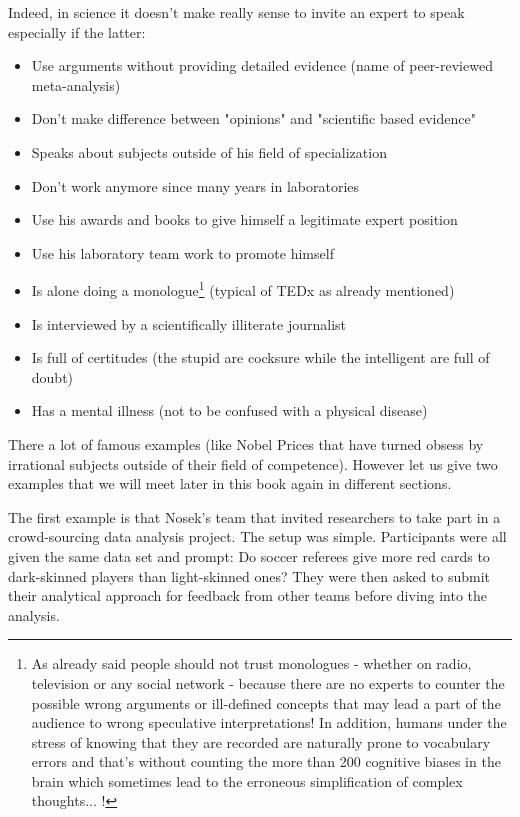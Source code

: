 	Indeed, in science it doesn't make really sense to invite an expert to speak especially if the latter:
	\begin{itemize}
		\item Use arguments without providing detailed evidence (name of peer-reviewed meta-analysis)
		
		\item Don't make difference between "opinions" and "scientific based evidence"
		
		\item Speaks about subjects outside of his field of specialization
		
		\item Don't work anymore since many years in laboratories
		
		\item Use his awards and books to give himself a legitimate expert position
		
		\item Use his laboratory team work to promote himself
		
		\item Is alone doing a monologue\footnote{As already said people should not trust monologues - whether on radio, television or any social network - because there are no experts to counter the possible wrong arguments or ill-defined concepts that may lead a part of the audience to wrong speculative interpretations! In addition, humans under the stress of knowing that they are recorded are naturally prone to vocabulary errors and that's without counting the more than 200 cognitive biases in the brain which sometimes lead to the erroneous simplification of complex thoughts... !} (typical of TEDx as already mentioned)
		
		\item Is interviewed by a scientifically illiterate journalist
		
		\item Is full of certitudes (the stupid are cocksure while the intelligent are full of doubt)
		
		\item Has a mental illness (not to be confused with a physical disease)
	\end{itemize}
	There a lot of famous examples (like Nobel Prices that have turned obsess by irrational subjects outside of their field of competence). However let us give two examples that we will meet later in this book again in different sections.
	
	 The first example is that Nosek's team that invited researchers to take part in a crowd-sourcing data analysis project. The setup was simple. Participants were all given the same data set and prompt: Do soccer referees give more red cards to dark-skinned players than light-skinned ones? They were then asked to submit their analytical approach for feedback from other teams before diving into the analysis.

